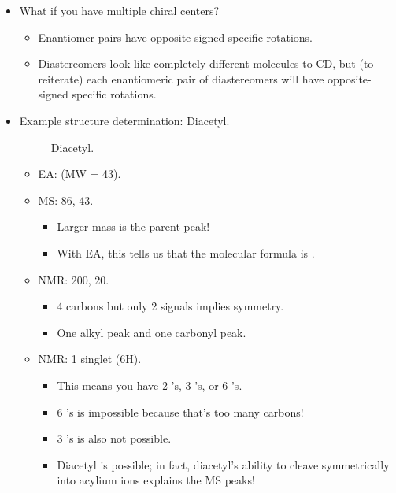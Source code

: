 \documentclass[../notes.tex]{subfiles}
\begin{document}
\begin{itemize}
    \item What if you have multiple chiral centers?
    \begin{itemize}
        \item Enantiomer pairs have opposite-signed specific rotations.
        \item Diastereomers look like completely different molecules to CD, but (to reiterate) each enantiomeric pair of diastereomers will have opposite-signed specific rotations.
    \end{itemize}
    \item Example structure determination: Diacetyl.
    \begin{figure}[h!]
        \centering
        \footnotesize
        \caption{Diacetyl.}
        \label{fig:diacetyl}
    \end{figure}
    \begin{itemize}
        \item EA:  (MW = 43).
        \item MS: 86, 43.
        \begin{itemize}
            \item Larger mass is the parent peak!
            \item With EA, this tells us that the molecular formula is .
        \end{itemize}
        \item {} NMR: 200, 20.
        \begin{itemize}
            \item 4 carbons but only 2 signals implies symmetry.
            \item One alkyl peak and one carbonyl peak.
        \end{itemize}
        \item {} NMR: 1 singlet (6H).
        \begin{itemize}
            \item This means you have 2 's, 3 's, or 6 's.
            \item 6 's is impossible because that's too many carbons!
            \item 3 's is also not possible.
            \item Diacetyl is possible; in fact, diacetyl's ability to cleave symmetrically into acylium ions explains the MS peaks!
        \end{itemize}
    \end{itemize}

\end{itemize}
\end{document}
